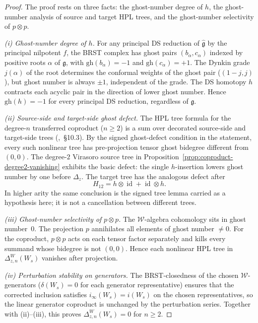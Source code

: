 \begin{proof}
The proof rests on three facts:
the ghost-number degree of $h$, the ghost-number analysis of
source and target HPL trees, and the ghost-number selectivity
of $p \otimes p$.

\emph{(i) Ghost-number degree of $h$.}
For any principal DS reduction of $\widehat{\mathfrak{g}}$ by the
principal nilpotent $f$, the BRST complex has ghost pairs
$(b_\alpha, c_\alpha)$ indexed by positive roots $\alpha$
of $\mathfrak{g}$, with $\mathrm{gh}(b_\alpha) = -1$ and
$\mathrm{gh}(c_\alpha) = +1$. The Dynkin grade $j(\alpha)$
of the root determines the conformal weights of the ghost
pair ($(1-j, j)$), but ghost number is always $\pm 1$,
independent of the grade. The DS homotopy $h$ contracts each
acyclic pair in the direction of lower ghost number. Hence
$\mathrm{gh}(h) = -1$ for every principal DS reduction,
regardless of $\mathfrak{g}$.

\emph{(ii) Source-side and target-side ghost defect.}
The HPL tree formula for the degree-$n$ transferred coproduct
($n \ge 2$) is a sum over decorated source-side and target-side
trees (\cite{LV12},~\S10.3). By the signed ghost-defect condition in
the statement, every such nonlinear tree has pre-projection tensor
ghost bidegree different from \((0,0)\). The degree-$2$ Virasoro
source tree in Proposition~\ref{prop:coproduct-degree2-vanishing}
exhibits the basic defect: the single \(h\)-insertion lowers ghost
number by one before \(\Delta_z\). The target tree has the analogous
defect after
\[
H_{12}=h\otimes\operatorname{id}+\operatorname{id}\otimes h .
\]
In higher arity the same conclusion is the signed tree lemma carried
as a hypothesis here; it is not a cancellation between different
trees.

\emph{(iii) Ghost-number selectivity of $p \otimes p$.}
The $\mathcal{W}$-algebra cohomology sits in ghost number~$0$.
The projection $p$ annihilates all elements of ghost number
$\ne 0$. For the coproduct, $p \otimes p$ acts on each tensor
factor separately and kills every summand whose bidegree is not
\((0,0)\). Hence each nonlinear HPL tree in
\(\Delta_{z,n}^W(W_s)\) vanishes after projection.

\emph{(iv) Perturbation stability on generators.}
The BRST-closedness of the chosen $\mathcal{W}$-generators
($\delta(W_s) = 0$ for each generator representative)
ensures that the corrected inclusion satisfies
$i_\infty(W_s) = i(W_s)$ on the chosen representatives, so the
linear generator coproduct is unchanged by the perturbation series.
Together with (ii)--(iii), this proves
\(\Delta_{z,n}^W(W_s)=0\) for \(n\ge2\).
\end{proof}

